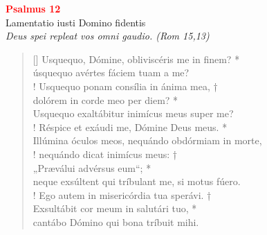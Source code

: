 


\def\greinitialformat#1{%
{\fontsize{39}{39}\selectfont #1}%
}




\vspace{0.3cm}
\begin{center}
 \textcolor{red}{\large \bf Psalmus 12}\\
Lamentatio iusti Domino fidentis\\
\textit{\small Deus spei repleat vos omni gaudio. (Rom 15,13)}
\end{center}
\begin{verse}[\versewidth]
Usquequo, Dómine, obliviscéris me in finem? *\\
úsquequo avértes fáciem tuam a me?\\!
\vin Usquequo ponam consília in ánima mea, †\\
\vin dolórem in corde meo per diem? *\\
\vin Usquequo exaltábitur inimícus meus super me?\\!
Réspice et exáudi me, Dómine Deus meus. *\\
Illúmina óculos meos, nequándo obdórmiam in morte,\\!
\vin nequándo dicat inimícus meus: †\\
\vin „Præválui advérsus eum“; *\\
\vin neque exsúltent qui tríbulant me, si motus fúero.\\!
Ego autem in misericórdia tua sperávi. †\\
Exsultábit cor meum in salutári tuo, *\\
cantábo Dómino qui bona tríbuit mihi.\\
\end{verse}
\vspace{1cm}


